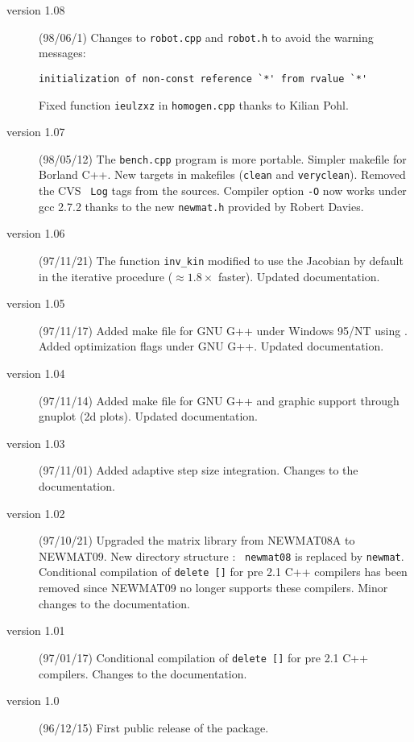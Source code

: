 \documentclass[dvips,11pt,fleqn]{report}
\begin{document}
\begin{description}
\item[version 1.08] (98/06/1) Changes to  {\tt robot.cpp} and {\tt robot.h} to avoid the
warning messages: \par
{\small \verb$initialization of non-const reference `*' from rvalue `*'$} \par
Fixed function {\tt ieulzxz} in {\tt homogen.cpp} thanks to Kilian Pohl. 

\item[version 1.07] (98/05/12) The {\tt bench.cpp} program is more
  portable.  Simpler makefile for\textsf{ Borland C++}. New targets in
  makefiles ({\tt clean} and {\tt veryclean}).  Removed the CVS {\tt
    Log} tags from the sources. Compiler option {\tt -O} now works
  under \textsf{gcc} 2.7.2 thanks to the new {\tt newmat.h} provided
  by Robert Davies.

\item[version 1.06] (97/11/21) The function {\tt inv\_kin} modified to
use the Jacobian by default in the iterative procedure ($\approx 1.8\times$ faster). 
Updated documentation.

\item[version 1.05] (97/11/17) Added make file for\textsf{ GNU G++}
  under \textsf{ Windows 95/NT} using
  .  Added optimization
  flags under \textsf{GNU G++}. Updated documentation.
  
\item[version 1.04] (97/11/14) Added make file for \textsf{GNU G++}
  and graphic support through \textsf{gnuplot} (2d plots). Updated
  documentation.

\item[version 1.03] (97/11/01) Added adaptive step size integration.
Changes to the documentation.

\item[version 1.02] (97/10/21) Upgraded the matrix library from
  \textsf{NEWMAT08A} to NEWMAT09. New directory structure : {\tt
    newmat08} is replaced by {\tt newmat}. Conditional compilation of
  {\tt delete []} for pre 2.1 C++ compilers has been removed since
  \textsf{NEWMAT09} no longer supports these compilers.  Minor changes
  to the documentation.

\item[version 1.01] (97/01/17) Conditional compilation of {\tt delete []} for pre 2.1 C++ compilers.
Changes to the documentation.


\item[version 1.0] (96/12/15) First public release of the package.
\end{description}
\newpage
\end{document}
